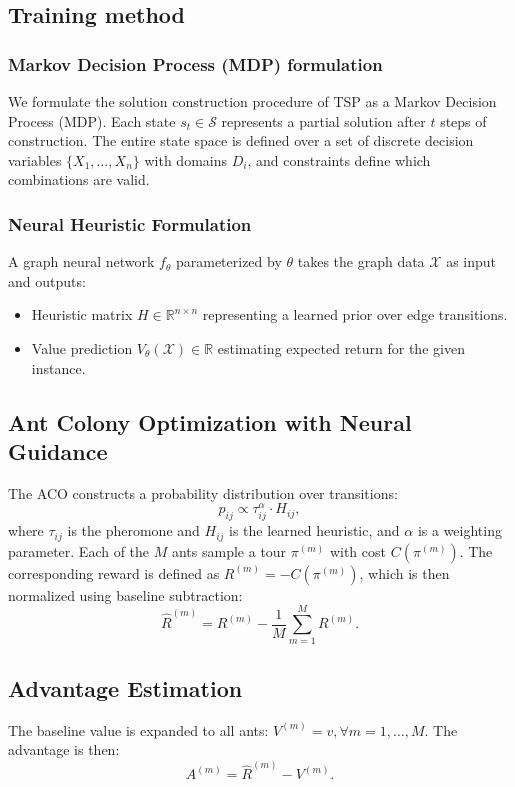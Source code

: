 \documentclass[a4paper,conference]{IEEEtran}
\newcommand{\RR}{\mathbb{R}}
\begin{document}
\subsection{Training method}
\subsubsection{Markov Decision Process (MDP) formulation}
We formulate the solution construction procedure of TSP as a Markov Decision Process (MDP). Each state $s_t\in\mathcal{S}$ represents a partial solution after $t$ steps of construction. The entire state space is defined over a set of discrete decision variables $\{X_1,\dots,X_n\}$ with domains $D_i$, and constraints define which combinations are valid.

\subsubsection{Neural Heuristic Formulation}
A graph neural network $f_{\theta}$ parameterized by $\theta$ takes the graph data $\mathcal{X}$ as input and outputs:
\begin{itemize}
  \item Heuristic matrix $H\in\RR^{n\times n}$ representing a learned prior over edge transitions.
  \item Value prediction $  V_{\theta}(\mathcal{X})\in\RR$ estimating expected return for the given instance.
\end{itemize}

\subsection{Ant Colony Optimization with Neural Guidance}
The ACO constructs a probability distribution over transitions:
\begin{equation}
p_{ij} \propto \tau_{ij}^\alpha \cdot H_{ij},
\end{equation}
where $\tau_{ij}$ is the pheromone and $H_{ij}$ is the learned heuristic, and $\alpha$ is a weighting parameter. Each of the $M$ ants sample a tour $\pi^{(m)}$ with cost $C(\pi^{(m)})$. The corresponding reward is defined as $R^{(m)} = -C(\pi^{(m)})$, which is then normalized using baseline subtraction:
\begin{equation}
\hat{R}^{(m)} = R^{(m)} - \frac{1}{M}\sum_{m=1}^M R^{(m)}.
\end{equation}

\subsection{Advantage Estimation}
The baseline value is expanded to all ants: $V^{(m)} = v, \forall m=1,\dots,M$. The advantage is then:
\begin{equation}
A^{(m)} = \hat{R}^{(m)} - V^{(m)}.
\end{equation}
\end{document}
